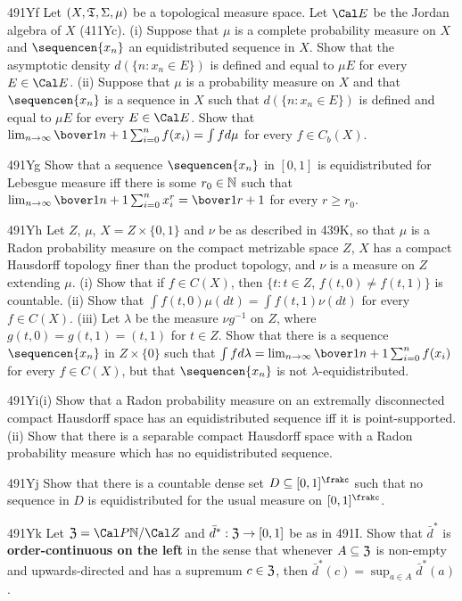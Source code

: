 {\spheader 491Yf Let $(X,\frak T,\Sigma,\mu)$ be a topological measure
space.   Let $\Cal E$ be the Jordan algebra of $X$ (411Yc).
(i) Suppose that $\mu$ is a complete probability measure on $X$ and
$\sequencen{x_n}$ an equidistributed sequence in $X$.
Show that the asymptotic density $d(\{n:x_n\in E\})$ is defined and
equal to $\mu E$ for every $E\in\Cal E$.  (ii) Suppose that $\mu$ is a
probability measure on $X$
and that $\sequencen{x_n}$ is a sequence in $X$ such that
$d(\{n:x_n\in E\})$ is defined and equal to $\mu E$ for every
$E\in\Cal E$.   Show that
$\lim_{n\to\infty}\bover1{n+1}\sum_{i=0}^nf(x_i)=\int fd\mu$ for every
$f\in C_b(X)$.

\spheader 491Yg Show that a sequence $\sequencen{x_n}$ in $[0,1]$
is equidistributed for Lebesgue measure iff there is some $r_0\in\Bbb N$
such that $\lim_{n\to\infty}\bover1{n+1}\sum_{i=0}^nx_i^r=\bover1{r+1}$
for every $r\ge r_0$.

\spheader 491Yh Let $Z$, $\mu$, $X=Z\times\{0,1\}$ and $\nu$ be as
described in 439K, so that $\mu$ is a Radon probability
measure on the compact metrizable space $Z$, $X$ has a compact
Hausdorff topology finer than the product topology,
and $\nu$ is a measure on $Z$ extending $\mu$.   (i) Show that if
$f\in C(X)$, then
$\{t:t\in Z$, $f(t,0)\ne f(t,1)\}$ is countable.   
(ii) Show that $\int f(t,0)\mu(dt)=\int f(t,1)\nu(dt)$ for every
$f\in C(X)$.
(iii) Let $\lambda$ be the measure $\nu g^{-1}$ on $Z$, where
$g(t,0)=g(t,1)=(t,1)$ for $t\in Z$.   Show that there is a
sequence $\sequencen{x_n}$ in $Z\times\{0\}$ such that
$\int fd\lambda=\lim_{n\to\infty}\bover1{n+1}\sum_{i=0}^nf(x_i)$ for
every $f\in C(X)$, but that $\sequencen{x_n}$ is not
$\lambda$-equidistributed.

\spheader 491Yi(i) Show that a Radon
probability measure on an extremally disconnected
compact Hausdorff space has an equidistributed sequence iff it is
point-supported.   
(ii) Show that there is a separable compact Hausdorff space with a Radon
probability measure which has no equidistributed sequence.

\spheader 491Yj Show that there is a countable dense set
$D\subseteq[0,1]^{\frakc}$ such that no sequence in $D$ is
equidistributed for the usual measure on $[0,1]^{\frakc}$.

\spheader 491Yk Let $\frak Z=\Cal P\Bbb N/\Cal Z$ and
$\bar d^*:\frak Z\to[0,1]$ be as in 491I.   Show that $\bar d^*$ is
{\bf order-continuous on the left} in the sense that whenever
$A\subseteq\frak Z$ is non-empty and upwards-directed and has a supremum
$c\in\frak Z$, then $\bar d^*(c)=\sup_{a\in A}\bar d^*(a)$.

}
